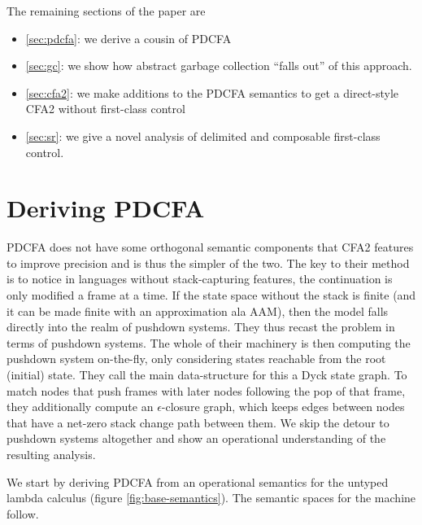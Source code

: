 The remaining sections of the paper are
\begin{itemize}
\item{\autoref{sec:pdcfa}: we derive a cousin of PDCFA}
\item{\autoref{sec:gc}: we show how abstract garbage collection ``falls out'' of this approach.}
\item{\autoref{sec:cfa2}: we make additions to the PDCFA semantics to get a direct-style CFA2 without first-class control}
\item{\autoref{sec:sr}: we give a novel analysis of delimited and composable first-class control.}
\end{itemize}

\section{Deriving PDCFA}
\label{sec:pdcfa}

PDCFA does not have some orthogonal semantic components that CFA2 features to improve precision and is thus the simpler of the two.
%
The key to their method is to notice in languages without stack-capturing features, the continuation is only modified a frame at a time.
%
If the state space without the stack is finite (and it can be made finite with an approximation ala AAM), then the model falls directly into the realm of pushdown systems.
%
They thus recast the problem in terms of pushdown systems.
%
The whole of their machinery is then computing the pushdown system on-the-fly, only considering states reachable from the root (initial) state.
%
They call the main data-structure for this a Dyck state graph.
%
To match nodes that push frames with later nodes following the pop of that frame, they additionally compute an $\epsilon$-closure graph, which keeps edges between nodes that have a net-zero stack change path between them.
%
We skip the detour to pushdown systems altogether and show an operational understanding of the resulting analysis.

We start by deriving PDCFA from an operational semantics for the untyped lambda calculus (figure \ref{fig:base-semantics}).
%
The semantic spaces for the machine follow.

